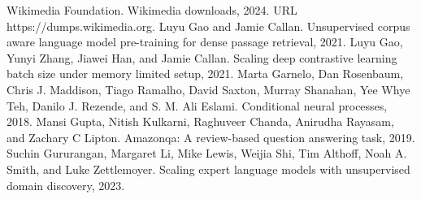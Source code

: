Wikimedia Foundation. Wikimedia downloads, 2024. URL https://dumps.wikimedia.org.
Luyu Gao and Jamie Callan. Unsupervised corpus aware language model pre-training for dense passage retrieval, 2021.
Luyu Gao, Yunyi Zhang, Jiawei Han, and Jamie Callan. Scaling deep contrastive learning batch size under memory limited setup, 2021.
Marta Garnelo, Dan Rosenbaum, Chris J. Maddison, Tiago Ramalho, David Saxton, Murray Shanahan, Yee Whye Teh, Danilo J. Rezende, and S. M. Ali Eslami. Conditional neural processes, 2018.
Mansi Gupta, Nitish Kulkarni, Raghuveer Chanda, Anirudha Rayasam, and Zachary C Lipton. Amazonqa: A review-based question answering task, 2019.
Suchin Gururangan, Margaret Li, Mike Lewis, Weijia Shi, Tim Althoff, Noah A. Smith, and Luke Zettlemoyer. Scaling expert language models with unsupervised domain discovery, 2023.

